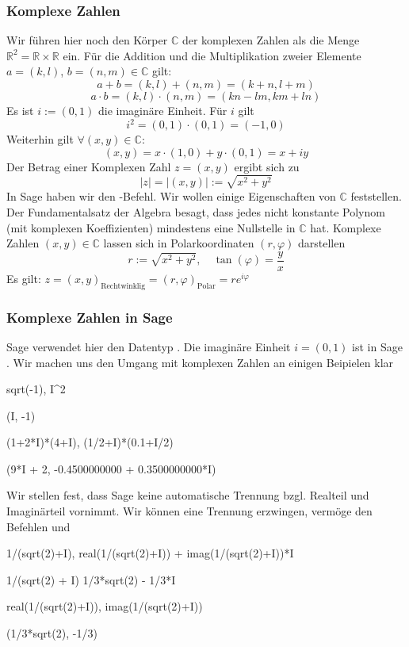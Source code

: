 \documentclass[fontsize=12pt,paper=a4,twoside,bibtotoc,idxtotoc,
liststotoc,pagesize,BCOR1.2cm,DIV15,chapterprefix,pagesize=pdftex]{scrbook}
\theoremstyle{plain}
\theoremstyle{definition}
\theoremstyle{remark}
\begin{document}
\subsubsection{Komplexe Zahlen}
Wir führen hier noch den Körper $\mathbb{C}$ der komplexen Zahlen als die Menge $\mathbb{R}^2=\mathbb{R} \times \mathbb{R}$ ein. 
Für die Addition und die Multiplikation zweier Elemente $a=(k,l)$, $b=(n,m)\in \mathbb{C}$ gilt: 
\[a+b=(k,l)+(n,m)=(k+n,l+m)\]
\[a\cdot b= (k,l) \cdot (n,m) = (kn-lm, km+ln) \]
Es ist $i:=(0,1)$ die imaginäre Einheit. Für $i$ gilt
\[ i^2=(0,1) \cdot (0,1) = (-1,0) \]
Weiterhin gilt  $\forall (x,y) \in \mathbb{C}:$
\[(x,y)=x \cdot (1,0) + y \cdot (0,1)= x +i y\]
Der Betrag einer Komplexen Zahl $z=(x,y)$ ergibt sich zu
\[|z|=|(x,y)|:=\sqrt{x^2+y^2}\]
In Sage haben wir den -Befehl. Wir wollen einige Eigenschaften von $\mathbb{C}$ feststellen.
Der Fundamentalsatz der Algebra besagt, dass jedes nicht konstante Polynom (mit komplexen Koeffizienten) mindestens eine Nullstelle in $\mathbb{C}$ hat. 
Komplexe Zahlen $(x,y) \in \mathbb{C}$ lassen sich in Polarkoordinaten $(r, \varphi)$ darstellen 
\[  r:= \sqrt{x^2+y^2}, \quad \tan(\varphi)=\frac{y}{x} \] 
Es gilt: $z = (x,y)_{\text{Rechtwinklig}} = (r,\varphi)_{\text{Polar}} = re^{i\varphi}$
\subsubsection{Komplexe Zahlen in Sage}
Sage verwendet hier den Datentyp .
 Die imaginäre Einheit $i=(0,1)$ ist in Sage .
Wir machen uns den Umgang mit komplexen Zahlen an einigen Beipielen klar
\begin{sagein}
sqrt(-1), I^2
\end{sagein}
\begin{sage}
(I, -1)
\end{sage}
\begin{sagein}
(1+2*I)*(4+I), (1/2+I)*(0.1+I/2)
\end{sagein}
\begin{sage}
 (9*I + 2, -0.4500000000 + 0.3500000000*I)
\end{sage}
Wir stellen fest, dass Sage keine automatische Trennung bzgl. Realteil und  Imaginärteil vornimmt. Wir können eine Trennung erzwingen, 
vermöge den Befehlen  und 
\begin{sagein}
1/(sqrt(2)+I), real(1/(sqrt(2)+I)) + imag(1/(sqrt(2)+I))*I
\end{sagein}
\begin{sage}
1/(sqrt(2) + I)
1/3*sqrt(2) - 1/3*I
\end{sage}
\begin{sagein}
real(1/(sqrt(2)+I)), imag(1/(sqrt(2)+I))
\end{sagein}
\begin{sage}
(1/3*sqrt(2), -1/3)
\end{sage}
\end{document}
